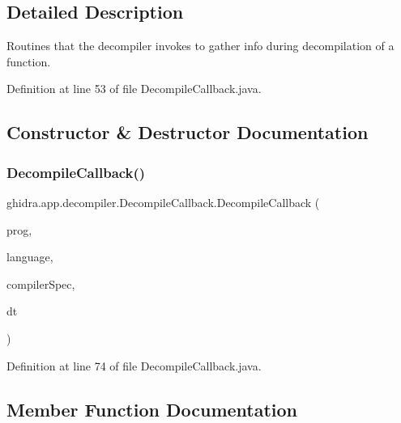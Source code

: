 \subsection{Detailed Description}
Routines that the decompiler invokes to gather info during decompilation of a function. 

Definition at line 53 of file Decompile\+Callback.\+java.



\subsection{Constructor \& Destructor Documentation}
\mbox{\label{classghidra_1_1app_1_1decompiler_1_1_decompile_callback_a001664bd31c3a4cb8ec3fdaf1d770749}} 
\subsubsection{\texorpdfstring{DecompileCallback()}{DecompileCallback()}}
{\footnotesize\ttfamily ghidra.\+app.\+decompiler.\+Decompile\+Callback.\+Decompile\+Callback (\begin{DoxyParamCaption}\item[{Program}]{prog,  }\item[{Language}]{language,  }\item[{Compiler\+Spec}]{compiler\+Spec,  }\item[{Pcode\+Data\+Type\+Manager}]{dt }\end{DoxyParamCaption})\hspace{0.3cm}{\ttfamily [inline]}}



Definition at line 74 of file Decompile\+Callback.\+java.



\subsection{Member Function Documentation}
\mbox{\label{classghidra_1_1app_1_1decompiler_1_1_decompile_callback_a4551fa26e2b4264540bcbe680d87c2a7}} 

